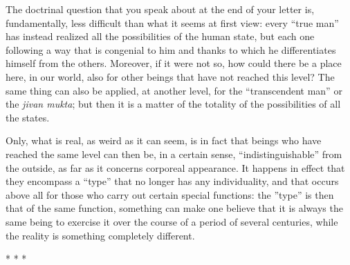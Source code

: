 The doctrinal question that you speak about at the end of your letter is, fundamentally, less difficult than what it seems at first view: every “true man” has instead realized all the possibilities of the human state, but each one following a way that is congenial to him and thanks to which he differentiates himself from the others. Moreover, if it were not so, how could there be a place here, in our world, also for other beings that have not reached this level? The same thing can also be applied, at another level, for the “transcendent man” or the \emph{jivan mukta}; but then it is a matter of the totality of the possibilities of all the states.

Only, what is real, as weird as it can seem, is in fact that beings who have reached the same level can then be, in a certain sense, “indistinguishable” from the outside, as far as it concerns corporeal appearance. It happens in effect that they encompass a “type” that no longer has any individuality, and that occurs above all for those who carry out certain special functions: the ”type” is then that of the same function, something can make one believe that it is always the same being to exercise it over the course of a period of several centuries, while the reality is something completely different.


* * *

